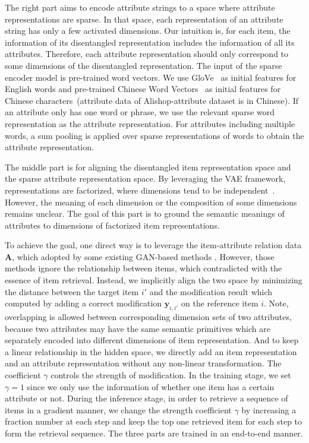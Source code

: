 The right part aims to encode attribute strings to a space where attribute representations are sparse. In that space, each representation of an attribute string has only a few activated dimensions. Our intuition is, for each item, the information of its disentangled representation includes the information of all its attributes. Therefore, each attribute representation should only correspond to some dimensions of the disentangled representation. The input of the sparse encoder model is pre-trained word vectors. We use GloVe~\cite{Pennington14glove} as initial features for English words and pre-trained Chinese Word Vectors~\cite{Shen18weibo} as initial features for Chinese characters~(attribute data of Alishop-attribute dataset is in Chinese). If an attribute only has one word or phrase, we use the relevant sparse word representation as the attribute representation. For attributes including multiple words, a sum pooling is applied over sparse representations of words to obtain the attribute representation.

The middle part is for aligning the disentangled item representation space and the sparse attribute representation space. By leveraging the VAE framework, representations are factorized, where dimensions tend to be independent~\cite{Locatello18ChallengeDisentangle}. However, the meaning of each dimension or the composition of some dimensions remains unclear. The goal of this part is to ground the semantic meanings of attributes to dimensions of factorized item representations. 

To achieve the goal, one direct way is to leverage the item-attribute relation data $\mathbf{A}$, which adopted by some existing GAN-based methods \cite{CycleGAN2017, lee2018diverse, shen2020interpreting, jahanian2020steerability, zhou2020ganbased}. However, those methods ignore the relationship between items, which contradicted with the essence of item retrieval. Instead, we implicitly align the two space by minimizing the distance between the target item $i'$ and the modification result which computed by adding a correct modification $\mathbf{y}_{i,i'}$ on the reference item $i$. Note, overlapping is allowed between corresponding dimension sets of two attributes, because two attributes may have the same semantic primitives which are separately encoded into different dimensions of item representation. And to keep a linear relationship in the hidden space, we directly add an item representation and an attribute representation without any non-linear transformation. The coefficient $\gamma$ controls the strength of modification. In the training stage, we set $\gamma = 1$ since we only use the information of whether one item has a certain attribute or not. During the inference stage, in order to retrieve a sequence of items in a gradient manner, we change the strength coefficient $\gamma$ by increasing a fraction number at each step and keep the top one retrieved item for each step to form the retrieval sequence. The three parts are trained in an end-to-end manner.

